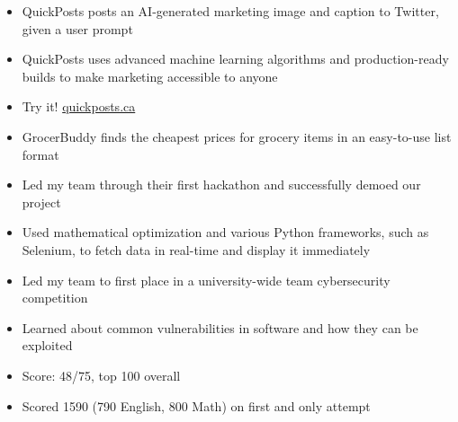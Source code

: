 \documentclass[10pt,a4paper,ragged2e]{altacv}
\begin{document}

\begin{itemize}
\item QuickPosts posts an AI-generated marketing image and caption to Twitter, given a user prompt
\item QuickPosts uses advanced machine learning algorithms and production-ready builds to make marketing accessible to anyone
\item Try it! \href{https://www.quickposts.ca/}{quickposts.ca}
\end{itemize}
\cvproject{}
\begin{itemize}
\item GrocerBuddy finds the cheapest prices for grocery items in an easy-to-use list format
\item Led my team through their first hackathon and successfully demoed our project
\item Used mathematical optimization and various Python frameworks, such as Selenium, to fetch data in real-time and display it immediately
\end{itemize}
\cvproject{}
\begin{itemize}
    \item Led my team to first place in a university-wide team cybersecurity competition
    \item Learned about common vulnerabilities in software and how they can be exploited
\end{itemize}
\smallskip
\smallskip
{}
\begin{itemize}
    \item Score: 48/75, top 100 overall
\end{itemize}
\smallskip
\smallskip
{}
\begin{itemize}
    \item Scored 1590 (790 English, 800 Math) on first and only attempt
\end{itemize}


\end{document}
